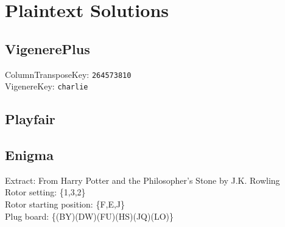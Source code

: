 \documentclass{article}
\begin{document}
\newpage

\section{Plaintext Solutions}
\subsection{VigenerePlus}
ColumnTransposeKey: \texttt{264573810}\\
VigenereKey: \texttt{charlie}\\
\subsection{Playfair}

\subsection{Enigma}

Extract: From Harry Potter and the Philosopher's Stone by J.K. Rowling\\
Rotor setting: \{1,3,2\}\\
Rotor starting position: \{F,E,J\}\\
Plug board: \{(BY)(DW)(FU)(HS)(JQ)(LO)\}\\
\end{document}
